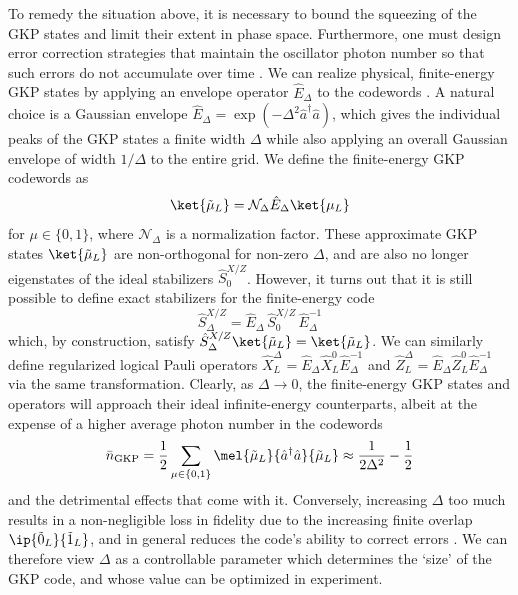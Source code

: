 To remedy the situation above, it is necessary to bound the squeezing of the GKP states and limit their extent in phase space. Furthermore, one must design error correction strategies that maintain the oscillator photon number so that such errors do not accumulate over time \cite{campagne2020gkp-expt}. We can realize physical, finite-energy GKP states by applying an envelope operator $\hat{E}_\Delta$ to the codewords \cite{royer2020gkp}. A natural choice is a Gaussian envelope $\hat{E}_\Delta = \exp(-\Delta^2 \hat{a}^\dagger\hat{a})$, which gives the individual peaks of the GKP states a finite width $\Delta$ while also applying an overall Gaussian envelope of width $1/\Delta$ to the entire grid. We define the finite-energy GKP codewords as 
\begin{equation}
    \ket{\tilde{\mu}_L} = \mathcal{N}_\Delta \hat{E}_\Delta \ket{\mu_L}
\end{equation}
for $\mu \in \{0, 1\}$, where $\mathcal{N}_\Delta$ is a normalization factor. These approximate GKP states $\ket{\tilde{\mu}_L}$ are non-orthogonal for non-zero $\Delta$, and are also no longer eigenstates of the ideal stabilizers $\hat{S}_0^{X/Z}$. However, it turns out that it is still possible to define exact stabilizers for the finite-energy code
\begin{equation}
    \hat{S}_\Delta^{X/Z} = \hat{E}_\Delta\,\hat{S}_0^{X/Z}\,\hat{E}_\Delta^{-1}
\end{equation}
which, by construction, satisfy $\hat{S}_\Delta^{X/Z}\ket{\tilde{\mu}_L} = \ket{\tilde{\mu}_L}$. We can similarly define regularized logical Pauli operators $\hat{X}_L^\Delta = \hat{E}_\Delta \hat{X}_L^0 \hat{E}_\Delta^{-1}$ and $\hat{Z}_L^\Delta = \hat{E}_\Delta \hat{Z}_L^0 \hat{E}_\Delta^{-1}$ via the same transformation. Clearly, as $\Delta \to 0$, the finite-energy GKP states and operators will approach their ideal infinite-energy counterparts, albeit at the expense of a higher average photon number in the codewords 
\begin{equation}
    \bar{n}_{\rm GKP} = \frac{1}{2} \sum_{\mu\in \{0,1\}} \mel{\tilde{\mu}_L}{\hat{a}^\dagger\hat{a}}{\tilde{\mu}_L} \approx \frac{1}{2\Delta^2} - \frac{1}{2}
\end{equation}
and the detrimental effects that come with it. Conversely, increasing $\Delta$ too much results in a non-negligible loss in fidelity due to the increasing finite overlap $\ip{\tilde{0}_L}{\tilde{1}_L}$, and in general reduces the code's ability to correct errors \cite{royer2020gkp}. We can therefore view $\Delta$ as a controllable parameter which determines the `size' of the GKP code, and whose value can be optimized in experiment. 


